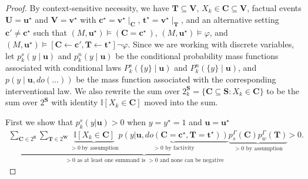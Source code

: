 \documentclass[anon,12pt]{clear2026} %
\begin{document}
\begin{proof}
By context-sensitive necessity, we have \(\mathbf{T} \subseteq \mathbf{V}\), $X_k\in\mathbf{C}\subseteq\mathbf{V}$, factual events $\mathbf{U}=\mathbf{u}^\star$ and $\mathbf{V}=\mathbf{v}^\star$ with $\mathbf{c}^\star=\mathbf{v}^\star\!\mid_{\mathbf{C}}$, $\mathbf{t}^\star = \mathbf{v}^\star\!\mid_{\mathbf{T}}$, and an alternative setting \(\mathbf{c'} \ne \mathbf{c}^\star\) such that \((M, \mathbf{u}^\star) \vDash (\mathbf{C} = \mathbf{c}^\star\,)\), \((M, \mathbf{u}^\star) \vDash \varphi\), and $(M, \mathbf{u}^\star) \vDash [\mathbf{C} \leftarrow \mathbf{c'}, \mathbf{T} \leftarrow \mathbf{t^\star}] \neg \varphi$. Since we are working with discrete variables, let $p_k^s(y\mid\mathbf{u})$ and $p_k^n(y\mid\mathbf{u})$ be the conditional probability mass functions associated with conditional laws $P_k^s(\{y\}\mid\mathbf{u})$ and $P_k^n(\{y\}\mid\mathbf{u})$, and $p(y\mid \mathbf{u}, do(\dots))$ be the mass function associated with the corresponding interventional law. We also rewrite the sum over $2^\mathbf{S}_k=\{\mathbf{C}\subseteq\mathbf{S}:X_k\in \mathbf{C}\}$ to be the sum over $2^\mathbf{S}$ with identity $\mathbb{I}[X_k\in\mathbf{C}]$ moved into the sum.

First we show that $p^s_k(y \vert \mathbf{u}) > 0$ when $y=y^\star = 1$ and $\mathbf{u}=\mathbf{u}^\star$
\begin{align*}
\underbrace{
\sum_{\mathbf{C} \in 2^\mathbf{S}} \sum_{\mathbf{T}\in 2^\mathbf{W}} 
\underbrace{\mathbb{I}[X_k \in \mathbf{C}]}_{>0\ \text{by assumption}}
\underbrace{p (y \vert \mathbf{u}, do(\mathbf{C} = \mathbf{c^\star}, \mathbf{T} = \mathbf{t^\star}))}_{>0 \text{ by factivity}}
\underbrace{p^\Gamma_s(\mathbf{C}) p^\Gamma_w(\mathbf{T})}_{>0 \text{ by assumption}}
}_{>0 \text{ as at least one summand is $>0$ and none can be negative}} &> 0.
\end{align*}

\end{proof}
\end{document}
